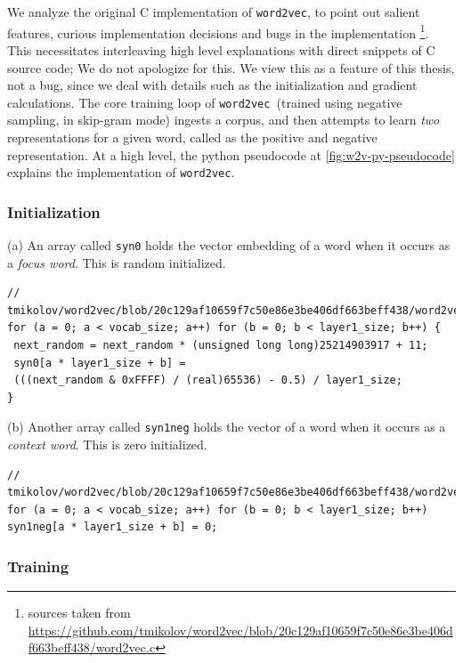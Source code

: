 \documentclass[11pt]{book}
\newcommand{\wtov}{\texttt{word2vec }}
\begin{document}
We analyze the original C implementation of \texttt{word2vec}, to point out
salient features, curious implementation decisions and bugs in the
implementation 
\footnote{sources taken from \url{https://github.com/tmikolov/word2vec/blob/20c129af10659f7c50e86e3be406df663beff438/word2vec.c}}.
This necessitates interleaving high level explanations with direct snippets of  C source code;
We do not apologize for this. We view this as a feature of this thesis, not a bug, since we deal
with details such as the initialization and gradient calculations.  The core
training loop of \wtov (trained using negative sampling, in skip-gram mode)
ingests a corpus, and then attempts to learn \emph{two} representations for a
given word, called as the positive and negative representation. At a high
level, the python pseudocode at \autoref{fig:w2v-py-pseudocode} explains the
implementation of \texttt{word2vec}.


\subsubsection{Initialization}
(a) An array called \texttt{syn0} holds the vector embedding of a word when it occurs
as a \emph{focus word}. This is random initialized.

\begin{verbatim}
// tmikolov/word2vec/blob/20c129af10659f7c50e86e3be406df663beff438/word2vec.c#L369
for (a = 0; a < vocab_size; a++) for (b = 0; b < layer1_size; b++) {
 next_random = next_random * (unsigned long long)25214903917 + 11;
 syn0[a * layer1_size + b] =
 (((next_random & 0xFFFF) / (real)65536) - 0.5) / layer1_size;
}
\end{verbatim}

(b) Another array called \texttt{syn1neg} holds the vector of a word when it occurs
as a \emph{context word}. This is zero initialized.

\begin{verbatim}
// tmikolov/word2vec/blob/20c129af10659f7c50e86e3be406df663beff438/word2vec.c#L365
for (a = 0; a < vocab_size; a++) for (b = 0; b < layer1_size; b++)
syn1neg[a * layer1_size + b] = 0;
\end{verbatim}


\subsubsection{Training}
\end{document}
